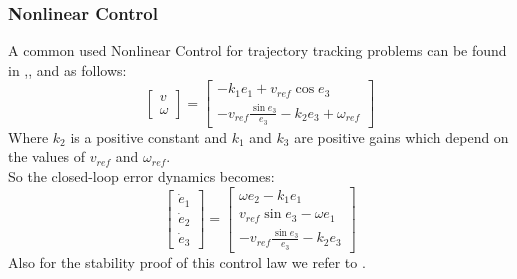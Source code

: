 \subsubsection{Nonlinear Control}
A common used Nonlinear Control for trajectory tracking problems can be found in \cite{samsonCanudas},\cite{samson},\cite{dixon} and \cite{siciliano} as follows:
\begin{equation}
	\left[\begin{matrix}
	v\\\omega
	\end{matrix}\right] = 
	\left[\begin{matrix}
	-k_1e_1+v_{ref}\cos e_3\\-v_{ref}\frac{\sin e_3}{e_3}-k_2e_3+\omega_{ref}
	\end{matrix}\right]
\end{equation}
Where $k_2$ is a positive constant and $k_1$ and $k_3$ are positive gains which depend on the values of $v_{ref}$ and $\omega_{ref}$. \\ So the closed-loop error dynamics becomes:
 \begin{equation}
	\left[\begin{matrix}
	\dot{e}_1\\\dot{e}_2\\\dot{e}_3
	\end{matrix}\right] = 
	\left[\begin{matrix}
	\omega e_2-k_1e_1\\v_{ref}\sin e_3-\omega e_1\\-v_{ref}\frac{\sin e_3}{e_3}-k_2e_3
	\end{matrix}\right]
\end{equation}
Also for the stability proof of this control law we refer to \cite{dixon}.
